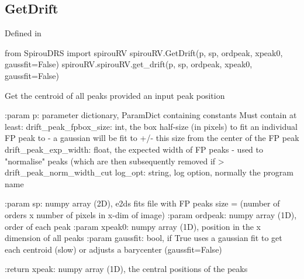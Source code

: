 \begin{minipage}{\textwidth}
\subsection{GetDrift}

Defined in \spirouRV{}

\begin{pythonbox}
from SpirouDRS import spirouRV
spirouRV.GetDrift(p, sp, ordpeak, xpeak0, gaussfit=False)
spirouRV.spirouRV.get_drift(p, sp, ordpeak, xpeak0, gaussfit=False)
\end{pythonbox}

\begin{pythondocstring}
Get the centroid of all peaks provided an input peak position

:param p: parameter dictionary, ParamDict containing constants
    Must contain at least:
            drift_peak_fpbox_size: int, the box half-size (in pixels) to
                                   fit an individual FP peak to - a
                                   gaussian will be fit to +/- this size
                                   from the center of the FP peak
            drift_peak_exp_width: float, the expected width of FP peaks -
                                  used to "normalise" peaks (which are then
                                  subsequently removed if >
                                  drift_peak_norm_width_cut
            log_opt: string, log option, normally the program name

:param sp: numpy array (2D), e2ds fits file with FP peaks
           size = (number of orders x number of pixels in x-dim of image)
:param ordpeak: numpy array (1D), order of each peak
:param xpeak0: numpy array (1D), position in the x dimension of all peaks
:param gaussfit: bool, if True uses a gaussian fit to get each centroid
                 (slow) or adjusts a barycenter (gaussfit=False)

:return xpeak: numpy array (1D), the central positions of the peaks
\end{pythondocstring}
\end{minipage}

